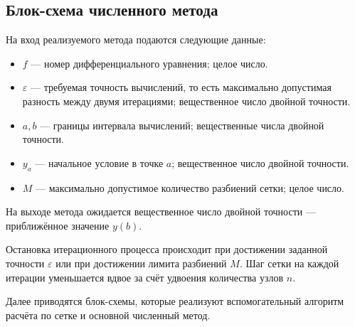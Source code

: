 \subsection{Блок-схема численного метода}

На вход реализуемого метода подаются следующие данные:

\begin{itemize}
  \item \(f\) --- номер дифференциального уравнения; целое число.
  \item \(\varepsilon\) --- требуемая точность вычислений, то есть максимально допустимая разность между двумя итерациями; вещественное число двойной точности.
  \item \(a, b\) --- границы интервала вычислений; вещественные числа двойной точности.
  \item \(y_a\) --- начальное условие в точке \(a\); вещественное число двойной точности.
  \item \(M\) --- максимально допустимое количество разбиений сетки; целое число.
\end{itemize}

На выходе метода ожидается вещественное число двойной точности --- приближённое значение \(y(b)\). 

Остановка итерационного процесса происходит при достижении заданной точности \(\varepsilon\) или при достижении лимита разбиений \(M\). Шаг сетки на каждой итерации уменьшается вдвое за счёт удвоения количества узлов \(n\).

Далее приводятся блок-схемы, которые реализуют вспомогательный алгоритм расчёта по сетке и основной численный метод.

\vspace*{\fill}


